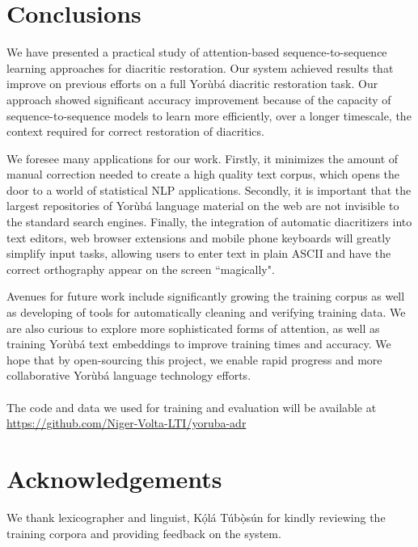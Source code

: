 \documentclass[a4paper]{article}
\begin{document}
\section{Conclusions}

We have presented a practical study of attention-based sequence-to-sequence learning approaches for diacritic restoration. Our system achieved results that improve on previous efforts on a full Yor{\`u}b{\'a} diacritic restoration task. Our approach showed significant accuracy improvement because of the capacity of sequence-to-sequence models to learn more efficiently, over a longer timescale, the context required for correct restoration of diacritics.

We foresee many applications for our work. Firstly, it minimizes the amount of manual correction needed to create a high quality text corpus, which opens the door to a world of statistical NLP applications. Secondly, it is important that the largest repositories of Yor{\`u}b{\'a} language material on the web are not invisible to the standard search engines. Finally, the integration of automatic diacritizers into text editors, web browser extensions and mobile phone keyboards will greatly simplify input tasks, allowing users to enter text in plain ASCII and have the correct orthography appear on the screen ``magically".

Avenues for future work include significantly growing the training corpus as well as developing of tools for automatically cleaning and verifying training data. We are also curious to explore more sophisticated forms of attention, as well as training Yor{\`u}b{\'a} text embeddings to improve training times and accuracy. We hope that by open-sourcing this project, we enable rapid progress and more collaborative Yor{\`u}b{\'a} language technology efforts. 
\\
\\
The code and data we used for training and evaluation will be available at \url{https://github.com/Niger-Volta-LTI/yoruba-adr}

\section{Acknowledgements}

We thank lexicographer and linguist, K\d{\'{o}}l\'{a} T\'{u}b\d{\`{o}}s\'{u}n for kindly reviewing the training corpora and providing feedback on the system.




\end{document}
